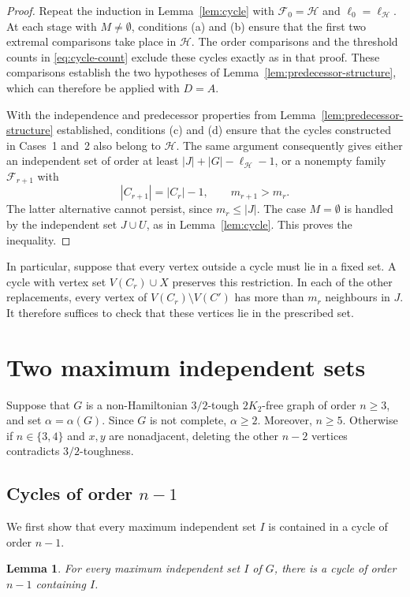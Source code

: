 \documentclass[11pt]{article}
\numberwithin{equation}{section}
\newtheorem{lemma}[theorem]{Lemma}
\theoremstyle{plain}
\theoremstyle{definition}
\theoremstyle{plain}
\begin{document}
\begin{proof}
Repeat the induction in Lemma~\ref{lem:cycle} with
$\mathcal F_0=\mathcal H$ and $\ell_0=\ell_{\mathcal H}$.
At each stage with $M\ne\emptyset$, conditions (a) and (b)
ensure that the first two extremal comparisons take place in
$\mathcal H$. The order comparisons and the threshold counts in \eqref{eq:cycle-count}
exclude these cycles exactly as in that proof.
These comparisons establish the two hypotheses of Lemma~\ref{lem:predecessor-structure},
which can therefore be applied with $D=A$.

With the independence and predecessor properties from Lemma~\ref{lem:predecessor-structure}
established, conditions (c) and (d) ensure that the cycles constructed
in Cases~1 and~2 also belong to $\mathcal H$.
The same argument consequently gives either an independent set
of order at least $|J|+|G|-\ell_{\mathcal H}-1$, or a nonempty
family $\mathcal F_{r+1}$ with
\[
 |C_{r+1}|=|C_r|-1,\qquad m_{r+1}>m_r.
\]
The latter alternative cannot persist, since $m_r\le |J|$.
The case $M=\emptyset$ is handled by the independent set $J\cup U$,
as in Lemma~\ref{lem:cycle}. This proves the inequality.
\end{proof}

In particular, suppose that every vertex outside a cycle must lie
in a fixed set. A cycle with vertex set $V(C_r)\cup X$ preserves
this restriction. In each of the other replacements, every vertex
of $V(C_r)\setminus V(C')$ has more than $m_r$ neighbours in $J$.
It therefore suffices to check that these vertices lie in the
prescribed set.

\section{Two maximum independent sets}
\label{sec:maximum-independent}

Suppose that $G$ is a
non-Hamiltonian $3/2$-tough $2K_2$-free graph of order $n\geq 3$, and
set $\alpha=\alpha(G)$. 
Since $G$ is not complete, $\alpha\geq 2$.
Moreover, $n\ge 5$.
Otherwise if $n\in\{3,4\}$ and $x,y$ are nonadjacent, deleting
the other $n-2$ vertices contradicts $3/2$-toughness.

\subsection{Cycles of order \texorpdfstring{$n-1$}{n-1}}
\label{subsec:near-spanning-cycles}

We first 
show that every maximum independent set \(I\) is contained in a cycle of order \(n-1\).
\begin{lemma}\label{lem:n-1cycle}
For every maximum independent set $I$ of $G$, there is a cycle of
order $n-1$ containing $I$.
\end{lemma}
\end{document}
